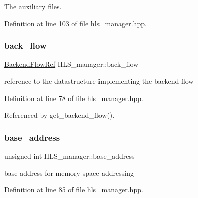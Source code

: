 The auxiliary files. 



Definition at line 103 of file hls\+\_\+manager.\+hpp.

\mbox{\label{classHLS__manager_aaad9c20dcbaf5165fd2383b4a5583ad1}} 
\subsubsection{\texorpdfstring{back\+\_\+flow}{back\_flow}}
{\footnotesize\ttfamily \hyperlink{BackendFlow_8hpp_addb01ef393ed4ea8a79765c8ebfcf5a0}{Backend\+Flow\+Ref} H\+L\+S\+\_\+manager\+::back\+\_\+flow\hspace{0.3cm}{\ttfamily [private]}}



reference to the datastructure implementing the backend flow 



Definition at line 78 of file hls\+\_\+manager.\+hpp.



Referenced by get\+\_\+backend\+\_\+flow().

\mbox{\label{classHLS__manager_a6dff7a61a281742bbc63efdfb3e10ac8}} 
\subsubsection{\texorpdfstring{base\+\_\+address}{base\_address}}
{\footnotesize\ttfamily unsigned int H\+L\+S\+\_\+manager\+::base\+\_\+address}



base address for memory space addressing 



Definition at line 85 of file hls\+\_\+manager.\+hpp.

\mbox{\label{classHLS__manager_ad77152ba7f522e214719ec634c93da3d}} 
